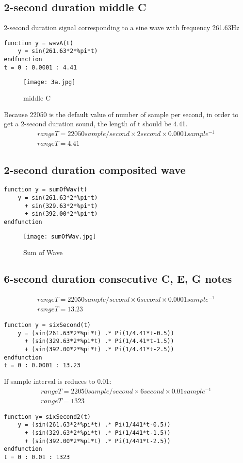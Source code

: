 \documentclass[12pt,fleqn]{article}
\begin{document}
\subsection{2-second duration middle C}
2-second duration signal corresponding to a sine wave with frequency 261.63Hz
\begin{lstlisting}[frame=single]
function y = wavA(t)
    y = sin(261.63*2*%pi*t)
endfunction
t = 0 : 0.0001 : 4.41
\end{lstlisting}
\begin{figure}[H]
\centering
\texttt{[image: 3a.jpg]}
\caption{middle C}
\end{figure}
Because 22050 is the default value of number of sample per second, in order to get a 2-second duration sound, the length of t should be 4.41.
\begin{gather}
rangeT = 22050 sample/second \times{} 2 second \times{} 0.0001 sample^{-1}\\
rangeT = 4.41
\end{gather}

\subsection{2-second duration composited wave}
\begin{lstlisting}[frame=single]
function y = sumOfWav(t)
    y = sin(261.63*2*%pi*t)
      + sin(329.63*2*%pi*t)
      + sin(392.00*2*%pi*t)
endfunction
\end{lstlisting}
\begin{figure}[H]
\centering
\texttt{[image: sumOfWav.jpg]}
\caption{Sum of Wave}
\end{figure}

\subsection{6-second duration consecutive C, E, G notes}
\begin{gather}
rangeT = 22050 sample/second \times{} 6 second \times{} 0.0001 sample^{-1}\\
rangeT = 13.23
\end{gather}
\begin{lstlisting}[frame=single]
function y = sixSecond(t)
    y = (sin(261.63*2*%pi*t) .* Pi(1/4.41*t-0.5))
      + (sin(329.63*2*%pi*t) .* Pi(1/4.41*t-1.5))
      + (sin(392.00*2*%pi*t) .* Pi(1/4.41*t-2.5))
endfunction
t = 0 : 0.0001 : 13.23\end{lstlisting}
If sample interval is reduces to 0.01:
\begin{gather}
rangeT = 22050 sample/second \times{} 6 second \times{} 0.01 sample^{-1}\\
rangeT = 1323
\end{gather}
\begin{lstlisting}[frame=single]
function y= sixSecond2(t)
    y = (sin(261.63*2*%pi*t) .* Pi(1/441*t-0.5))
      + (sin(329.63*2*%pi*t) .* Pi(1/441*t-1.5))
      + (sin(392.00*2*%pi*t) .* Pi(1/441*t-2.5))
endfunction
t = 0 : 0.01 : 1323
\end{lstlisting}
\end{document}
